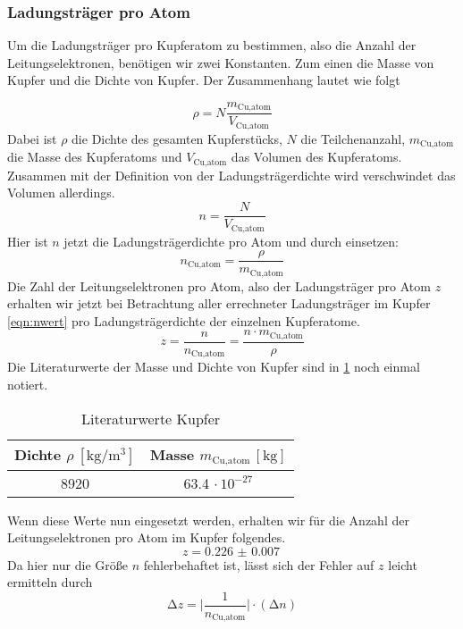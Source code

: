 \subsubsection{Ladungsträger pro Atom}
Um die Ladungsträger pro Kupferatom zu bestimmen, also die Anzahl der Leitungselektronen, benötigen wir zwei Konstanten.
Zum einen die Masse von Kupfer und die Dichte von Kupfer. Der Zusammenhang lautet wie folgt

\begin{equation}
\nonumber
\rho = N \frac{m_{\text{Cu,atom}}}{V_{\text{Cu,atom}}}
\end{equation}
Dabei ist $\rho$ die Dichte des gesamten Kupferstücks, $N$ die Teilchenanzahl, $m_{\text{Cu,atom}}$ die Masse des Kupferatoms und $V_{\text{Cu,atom}}$ das Volumen des Kupferatoms.
Zusammen mit der Definition von der Ladungsträgerdichte wird verschwindet das Volumen allerdings.
\begin{equation}
\nonumber
n = \frac{N}{V_{\text{Cu,atom}}}
\end{equation}
Hier ist $n$ jetzt die Ladungsträgerdichte pro Atom und durch einsetzen:
\begin{equation}
\nonumber
n_{\text{Cu,atom}} = \frac{\rho}{m_{\text{Cu,atom}}}
\end{equation}
Die Zahl der Leitungselektronen pro Atom, also der Ladungsträger pro Atom $z$ erhalten wir jetzt bei Betrachtung aller errechneter Ladungsträger im Kupfer \eqref{eqn:nwert} pro 
Ladungsträgerdichte der einzelnen Kupferatome. 
\begin{equation}
\nonumber
z = \frac{n}{n_{\text{Cu,atom}}} = \frac{n \cdot m_{\text{Cu,atom}}}{\rho}
\end{equation}
Die Literaturwerte der Masse und Dichte von Kupfer sind in \ref{tab:kupferlit} noch einmal notiert.
\begin{table}
  \centering
  \caption{Literaturwerte Kupfer}
  \label{tab:kupferlit}
  \begin{tabular}{c c }
    Dichte {$\rho \: [\si{\kilo\gram\per\meter\cubed}]$} & Masse $m_{\text{Cu,atom}} \, [\si{\kilo\gram}]$\\
    \midrule
    8920   & 63.4 $\cdot \, 10^{-27}$ \\
    \bottomrule
  \end{tabular}
\end{table}
Wenn diese Werte nun eingesetzt werden, erhalten wir für die Anzahl der Leitungselektronen pro Atom im Kupfer folgendes.
\begin{equation}
z = \SI{0.226(7)}{}
\end{equation}
Da hier nur die Größe $n$ fehlerbehaftet ist, lässt sich der Fehler auf  $z$ leicht ermitteln durch
\begin{equation}
\increment z = \biggl| \frac{1}{n_{\text{Cu,atom}}}\biggr| \cdot (\increment n)
\end{equation}

